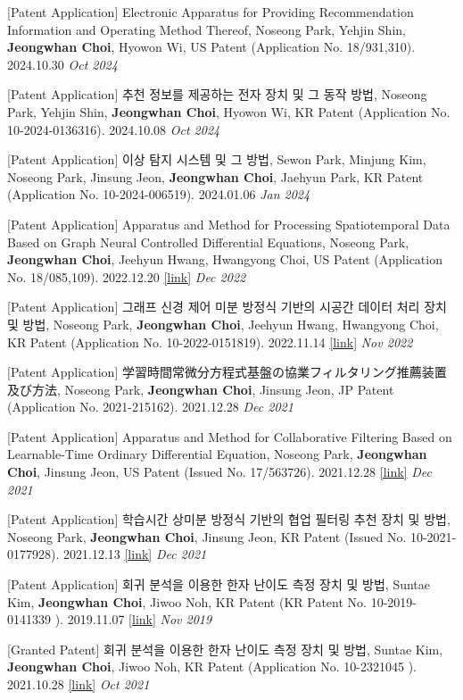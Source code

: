 \documentclass[10pt]{article}
\newenvironment{changemargin}[2]{
  \begin{list}{}{
    \setlength{\topsep}{0pt}
    \setlength{\leftmargin}{#1}
    \setlength{\rightmargin}{#2}
    \setlength{\listparindent}{\parindent}
    \setlength{\itemindent}{\parindent}
    \setlength{\parsep}{\parskip}
  }
  \item[]}{\end{list}
}
\newcommand{\presentation}[2]{
	{#1} \hfill \emph{#2}\\ \bigskip
}
\newenvironment{body} {
	\vspace*{-16pt}
	\begin{changemargin}{-0.25in}{-0.5in}
  }
	{\end{changemargin}
}
\begin{document}
\begin{body}
	\vspace{14pt}

\presentation{[Patent Application] Electronic Apparatus for Providing Recommendation Information and Operating Method Thereof, Noseong Park, Yehjin Shin, \textbf{Jeongwhan Choi}, Hyowon Wi, US Patent (Application No. 18/931,310). 2024.10.30}{Oct 2024}	
	
\presentation{[Patent Application] 추천 정보를 제공하는 전자 장치 및 그 동작 방법, Noseong Park, Yehjin Shin, \textbf{Jeongwhan Choi}, Hyowon Wi, KR Patent (Application No. 10-2024-0136316). 2024.10.08}{Oct 2024}	


\presentation{[Patent Application] 이상 탐지 시스템 및 그 방법, Sewon Park, Minjung Kim, Noseong Park, Jinsung Jeon, \textbf{Jeongwhan Choi}, Jaehyun Park, KR Patent (Application No. 10-2024-006519). 2024.01.06 }{Jan 2024}

\presentation{[Patent Application] Apparatus and Method for Processing Spatiotemporal Data Based on Graph Neural Controlled Differential Equations, Noseong Park, \textbf{Jeongwhan Choi}, Jeehyun Hwang, Hwangyong Choi, US Patent (Application No. 18/085,109). 2022.12.20 \href{https://patents.google.com/patent/US20230186105A1/en}{[link]}}{Dec 2022}	

\presentation{[Patent Application] 그래프 신경 제어 미분 방정식 기반의 시공간 데이터 처리 장치 및 방법, Noseong Park, \textbf{Jeongwhan Choi}, Jeehyun Hwang, Hwangyong Choi, KR Patent (Application No. 10-2022-0151819). 2022.11.14 \href{https://patents.google.com/patent/KR20240073179A/en}{[link]}}{Nov 2022}

\presentation{[Patent Application] 学習時間常微分方程式基盤の協業フィルタリング推薦装置及び方法, Noseong Park, \textbf{Jeongwhan Choi}, Jinsung Jeon, JP Patent (Application No. 2021-215162). 2021.12.28}{Dec 2021}	

\presentation{[Patent Application] Apparatus and Method for Collaborative Filtering Based on Learnable-Time Ordinary Differential Equation, Noseong Park, \textbf{Jeongwhan Choi}, Jinsung Jeon, US Patent (Issued No.	17/563726). 2021.12.28 \href{https://patents.google.com/patent/US20230186105A1/en}{[link]}}{Dec 2021}	

\presentation{[Patent Application] 학습시간 상미분 방정식 기반의 협업 필터링 추천 장치 및 방법, Noseong Park, \textbf{Jeongwhan Choi}, Jinsung Jeon, KR Patent (Issued No. 10-2021-0177928). 2021.12.13 \href{http://kpat.kipris.or.kr/kpat/biblioa.do?method=biblioFrame}{[link]}}{Dec 2021}

\presentation{[Patent Application] 회귀 분석을 이용한 한자 난이도 측정 장치 및 방법, Suntae Kim, \textbf{Jeongwhan Choi}, Jiwoo Noh, KR Patent (KR Patent No. 10-2019-0141339 ). 2019.11.07 \href{https://doi.org/10.8080/1020190141339}{[link]}}{Nov 2019}	

\presentation{[Granted Patent] 회귀 분석을 이용한 한자 난이도 측정 장치 및 방법, Suntae Kim, \textbf{Jeongwhan Choi}, Jiwoo Noh, KR Patent (Application No. 10-2321045 ). 2021.10.28 \href{https://doi.org/10.8080/1020190141339}{[link]}}{Oct 2021}
  
\end{body}
    
\end{document}

